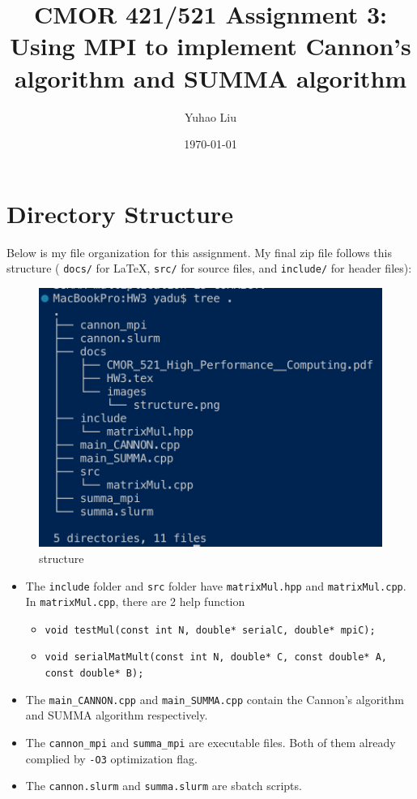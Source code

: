 \documentclass[11pt]{article}
\title{CMOR 421/521 Assignment 3: Using MPI to implement Cannon's algorithm and SUMMA algorithm}
\author{Yuhao Liu}
\date{\today}
\begin{document}
\maketitle

\tableofcontents
\bigskip

\newpage

\section{Directory Structure}
Below is my file organization for this assignment. 
My final zip file follows this structure ( \texttt{docs/} for LaTeX, \texttt{src/} for source files, and \texttt{include/} for header files):

\begin{figure}[H]
    \centering
    \includegraphics[width=0.5\linewidth]{Assignments/HW3/docs/images/structure.png}
    \caption{structure}
    \label{fig:structure}
\end{figure}

\begin{itemize}
    \item The \verb|include| folder and \verb|src| folder have \verb|matrixMul.hpp| and \verb|matrixMul.cpp|. In \verb|matrixMul.cpp|, there are 2 help function 
    \begin{itemize}
        \item \texttt{void testMul(const int N, double* serialC, double* mpiC);}  
    
        \item \texttt{void serialMatMult(const int N, double* C, const double* A, const double* B);}  
    \end{itemize}

    \item The \verb|main_CANNON.cpp| and \verb|main_SUMMA.cpp| contain the Cannon's algorithm and SUMMA algorithm respectively.
    \item The \verb|cannon_mpi| and \verb|summa_mpi| are executable files. Both of them already complied by \verb|-O3| optimization flag.
    \item The \verb|cannon.slurm| and \verb|summa.slurm| are sbatch scripts.
\end{itemize}
\end{document}
